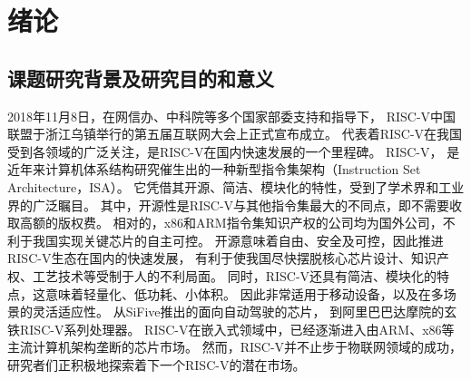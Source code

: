 \chapter{绪论}





\section{课题研究背景及研究目的和意义}
2018年11月8日，在网信办、中科院等多个国家部委支持和指导下，
RISC-V中国联盟于浙江乌镇举行的第五届互联网大会上正式宣布成立。
代表着RISC-V在我国受到各领域的广泛关注，是RISC-V在国内快速发展的一个里程碑。
RISC-V\cite{asanovic2014instruction}，
是近年来计算机体系结构研究催生出的一种新型指令集架构（Instruction Set Architecture，ISA）。
它凭借其开源、简洁、模块化的特性，受到了学术界和工业界的广泛瞩目。
其中，开源性是RISC-V与其他指令集最大的不同点，即不需要收取高额的版权费。
相对的，x86和ARM指令集知识产权的公司均为国外公司，不利于我国实现关键芯片的自主可控。
开源意味着自由、安全及可控，因此推进RISC-V生态在国内的快速发展，
有利于使我国尽快摆脱核心芯片设计、知识产权、工艺技术等受制于人的不利局面。
同时，RISC-V还具有简洁、模块化的特点，这意味着轻量化、低功耗、小体积。
因此非常适用于移动设备，以及在多场景的灵活适应性。
从SiFive推出的面向自动驾驶的芯片\cite{sifive-automotive}，
到阿里巴巴达摩院的玄铁RISC-V系列处理器\cite{xuantie}。
RISC-V在嵌入式领域中，已经逐渐进入由ARM、x86等主流计算机架构垄断的芯片市场。
然而，RISC-V并不止步于物联网领域的成功，研究者们正积极地探索着下一个RISC-V的潜在市场。

